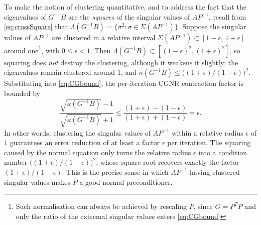 \documentclass[hidelinks,onefignum,onetabnum]{siamart220329}
\begin{document}
{To make the notion of clustering quantitative, and to address the fact that the eigenvalues of $G^{-1}B$ are the \emph{squares} of the singular values of $AP^{-1}$, recall from \eqref{eq:crossSquare} that $\Lambda(G^{-1}B) = \{\sigma^2 : \sigma\in\Sigma(AP^{-1})\}$. Suppose the singular values of $AP^{-1}$ are clustered in a relative interval $\Sigma(AP^{-1})\subset[1-\epsilon,\,1+\epsilon]$ around one\footnote{Such normalisation can always be achieved by rescaling $P$, since $G=P^TP$ and only the ratio of the extremal singular values enters \eqref{eq:CGbound}}, with $0\le\epsilon<1$. Then $\Lambda(G^{-1}B)\subset[(1-\epsilon)^2,(1+\epsilon)^2]$, so squaring does \emph{not} destroy the clustering, although it weakens it slightly: the eigenvalues remain clustered around $1$, and $\kappa(G^{-1}B)\le\big((1+\epsilon)/(1-\epsilon)\big)^2$. Substituting into \eqref{eq:CGbound}, the per-iteration CGNR contraction factor is bounded by
\[
    \frac{\sqrt{\kappa(G^{-1}B)}-1}{\sqrt{\kappa(G^{-1}B)}+1} \le \frac{(1+\epsilon)-(1-\epsilon)}{(1+\epsilon)+(1-\epsilon)} = \epsilon .
\]
In other words, clustering the singular values of $AP^{-1}$ within a relative radius $\epsilon$ of $1$ guarantees an error reduction of at least a factor $\epsilon$ per iteration. The squaring caused by the normal equation only turns the relative radius $\epsilon$ into a condition number $\big((1+\epsilon)/(1-\epsilon)\big)^2$, whose square root recovers exactly the factor $(1+\epsilon)/(1-\epsilon)$. This is the precise sense in which $AP^{-1}$ having clustered singular values makes $P$ a good normal preconditioner.}
\end{document}
